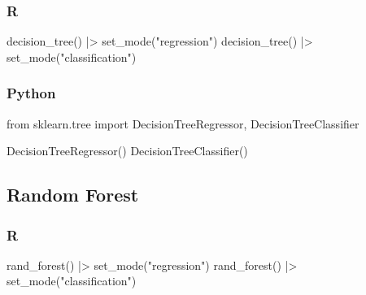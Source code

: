 \documentclass[
  letterpaper,
  DIV=11,
  numbers=noendperiod]{scrreprt}
\newenvironment{Shaded}{\begin{snugshade}}{\end{snugshade}}
\newcommand{\FunctionTok}[1]{\textcolor[rgb]{0.28,0.35,0.67}{#1}}
\newcommand{\ImportTok}[1]{\textcolor[rgb]{0.00,0.46,0.62}{#1}}
\newcommand{\NormalTok}[1]{\textcolor[rgb]{0.00,0.46,0.62}{#1}}
\newcommand{\SpecialCharTok}[1]{\textcolor[rgb]{0.37,0.37,0.37}{#1}}
\newcommand{\StringTok}[1]{\textcolor[rgb]{0.13,0.47,0.30}{#1}}
\begin{document}
\hypertarget{r-76}{%
\subsubsection{R}\label{r-76}}

\begin{Shaded}
\begin{Highlighting}[]
\FunctionTok{decision\_tree}\NormalTok{() }\SpecialCharTok{|\textgreater{}} \FunctionTok{set\_mode}\NormalTok{(}\StringTok{"regression"}\NormalTok{)}
\FunctionTok{decision\_tree}\NormalTok{() }\SpecialCharTok{|\textgreater{}} \FunctionTok{set\_mode}\NormalTok{(}\StringTok{"classification"}\NormalTok{)}
\end{Highlighting}
\end{Shaded}

\hypertarget{python-76}{%
\subsubsection{Python}\label{python-76}}

\begin{Shaded}
\begin{Highlighting}[]
\ImportTok{from}\NormalTok{ sklearn.tree }\ImportTok{import}\NormalTok{ DecisionTreeRegressor, DecisionTreeClassifier}

\NormalTok{DecisionTreeRegressor()}
\NormalTok{DecisionTreeClassifier()}
\end{Highlighting}
\end{Shaded}

\hypertarget{random-forest}{%
\subsection{Random Forest}\label{random-forest}}

\hypertarget{r-77}{%
\subsubsection{R}\label{r-77}}

\begin{Shaded}
\begin{Highlighting}[]
\FunctionTok{rand\_forest}\NormalTok{() }\SpecialCharTok{|\textgreater{}} \FunctionTok{set\_mode}\NormalTok{(}\StringTok{"regression"}\NormalTok{)}
\FunctionTok{rand\_forest}\NormalTok{() }\SpecialCharTok{|\textgreater{}} \FunctionTok{set\_mode}\NormalTok{(}\StringTok{"classification"}\NormalTok{)}
\end{Highlighting}
\end{Shaded}
\end{document}
